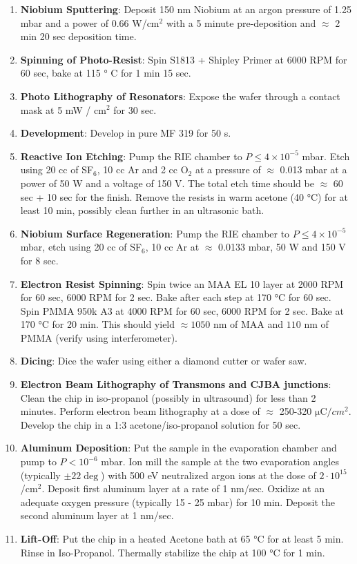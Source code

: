 \begin{enumerate}
\item \textbf{Niobium Sputtering}: Deposit 150 nm Niobium at an argon pressure of 1.25 mbar and a power of 0.66 W/cm$^2$ with a 5 minute pre-deposition and $\approx$ 2 min 20 sec deposition time.
\item \textbf{Spinning of Photo-Resist}: Spin S1813 + Shipley Primer at 6000 RPM for 60 sec, bake at 115 ° C for 1 min 15 sec.
\item \textbf{Photo Lithography of Resonators}: Expose the wafer through a contact mask at 5 mW / cm$^2$ for 30 sec.
\item \textbf{Development}: Develop in pure MF 319 for 50 s.
\item \textbf{Reactive Ion Etching}: Pump the RIE chamber to $P\le 4\times 10^{-5}$ mbar. Etch using 20 cc of SF$_6$, 10 cc Ar and 2 cc O$_2$ at a pressure of $\approx$ 0.013 mbar at a power of 50 W and a voltage of 150 V. The total etch time should be $\approx $ 60 sec + 10 sec for the finish. Remove the resists in warm acetone (40 °C) for at least 10 min, possibly clean further in an ultrasonic bath.
\item \textbf{Niobium Surface Regeneration}: Pump the RIE chamber  to $P\le 4\times 10^{-5}$ mbar, etch using 20 cc of SF$_6$, 10 cc Ar at $\approx$ 0.0133 mbar, 50 W and 150 V for 8 sec.
\item \textbf{Electron Resist Spinning}: Spin twice an MAA EL 10 layer at 2000 RPM for 60 sec, 6000 RPM for 2 sec. Bake after each step at 170 °C for 60 sec. Spin PMMA 950k A3 at 4000 RPM for 60 sec, 6000 RPM for 2 sec. Bake at 170 °C for 20 min. This should yield $\approx 1050$ nm of MAA and $110$ nm of PMMA (verify using interferometer).
\item \textbf{Dicing}: Dice the wafer using either a diamond cutter or wafer saw.
\item \textbf{Electron Beam Lithography of Transmons and CJBA junctions}: Clean the chip in iso-propanol (possibly in ultrasound) for less than 2 minutes. Perform electron beam lithography at a dose of $\approx$ 250-320 $\mathrm{\mu C}/cm^2$. Develop the chip in a 1:3 acetone/iso-propanol solution for 50 sec.
\item \textbf{Aluminum Deposition}: Put the sample in the evaporation chamber and pump to $P<10^{-6}$ mbar. Ion mill the sample at the two evaporation angles (typically $\pm 22\deg$) with 500 eV neutralized argon ions at the dose of $2\cdot 10^{15}$/cm$^2$. Deposit first aluminum layer at a rate of 1 nm/sec. Oxidize at an adequate oxygen pressure (typically 15 - 25 mbar) for 10 min. Deposit the second aluminum layer at 1 nm/sec.
\item \textbf{Lift-Off}: Put the chip in a heated Acetone bath at 65 °C for at least 5 min. Rinse in Iso-Propanol. Thermally stabilize the chip at 100 °C for 1 min.
\end{enumerate}
